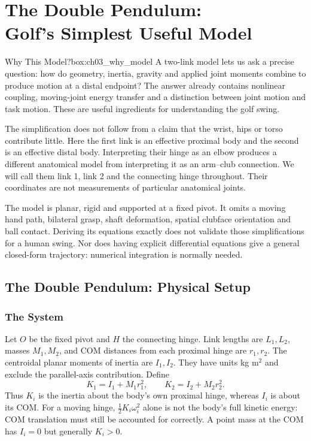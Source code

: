 \chapter[The Double Pendulum: Golf's Simplest Useful Model]{The Double Pendulum:\\Golf's Simplest Useful Model}
\label{ch:03_double_pendulum}
\raggedbottom



\begin{laymansbox}{Why This Model?}{box:ch03_why_model}
A two-link model lets us ask a precise question: how do geometry, inertia, gravity and applied joint moments combine to produce motion at a distal endpoint? The answer already contains nonlinear coupling, moving-joint energy transfer and a distinction between joint motion and task motion. These are useful ingredients for understanding the golf swing.

The simplification does not follow from a claim that the wrist, hips or torso contribute little. Here the first link is an effective proximal body and the second is an effective distal body. Interpreting their hinge as an elbow produces a different anatomical model from interpreting it as an arm--club connection. We will call them link 1, link 2 and the connecting hinge throughout. Their coordinates are not measurements of particular anatomical joints.

The model is planar, rigid and supported at a fixed pivot. It omits a moving hand path, bilateral grasp, shaft deformation, spatial clubface orientation and ball contact. Deriving its equations exactly does not validate those simplifications for a human swing. Nor does having explicit differential equations give a general closed-form trajectory: numerical integration is normally needed.
\end{laymansbox}

\section{The Double Pendulum: Physical Setup}
\subsection*{The System}
Let $O$ be the fixed pivot and $H$ the connecting hinge. Link lengths are $L_1,L_2$, masses $M_1,M_2$, and COM distances from each proximal hinge are $r_1,r_2$. The centroidal planar moments of inertia are $I_1,I_2$. They have units kg m$^2$ and exclude the parallel-axis contribution. Define
\[
K_1=I_1+M_1r_1^2,\qquad K_2=I_2+M_2r_2^2.
\]
Thus $K_i$ is the inertia about the body's own proximal hinge, whereas $I_i$ is about its COM. For a moving hinge, $\tfrac12K_i\omega_i^2$ alone is not the body's full kinetic energy: COM translation must still be accounted for correctly. A point mass at the COM has $I_i=0$ but generally $K_i>0$.

